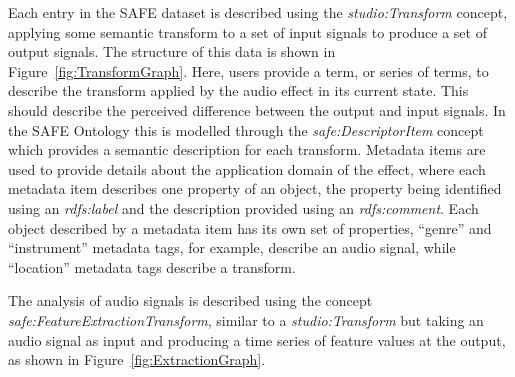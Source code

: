 		Each entry in the SAFE dataset is described using the \emph{studio:Transform} concept, applying some
		semantic transform to a set of input signals to produce a set of output signals. The structure of this data
		is shown in Figure~\ref{fig:TransformGraph}. Here, users provide a term, or series of terms, to describe
		the transform applied by the audio effect in its current state. This should describe the perceived
		difference between the output and input signals. In the SAFE Ontology this is modelled through the
		\emph{safe:DescriptorItem} concept which provides a semantic description for each transform. Metadata items
		are used to provide details about the application domain of the effect, where each metadata item describes
		one property of an object, the property being identified using an \emph{rdfs:label} and the description
		provided using an \emph{rdfs:comment}. Each object described by a metadata item has its own set of
		properties, ``genre'' and ``instrument'' metadata tags, for example, describe an audio signal, while
		``location'' metadata tags describe a transform.

		The analysis of audio signals is described using the concept \emph{safe:FeatureExtractionTransform},
		similar to a \emph{studio:Transform} but taking an audio signal as input and producing a time series of
		feature values at the output, as shown in Figure~\ref{fig:ExtractionGraph}.


